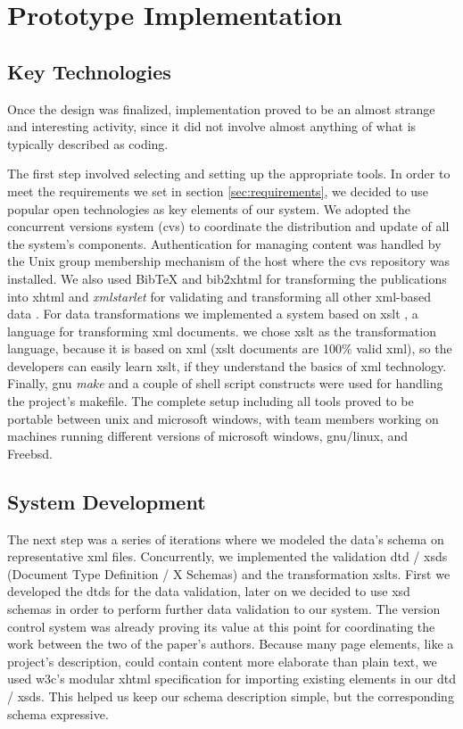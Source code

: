 \documentclass{elsart}
\begin{document}
\section{Prototype Implementation}

\subsection{Key Technologies}
\label{subsec:key-tech}

Once the design was finalized,
implementation proved to be an almost strange and interesting activity,
since it did not involve almost anything of what
is typically described as coding.

The first step involved selecting and setting up the
appropriate tools. In order to meet the requirements we set in section \ref{sec:requirements}, 
we decided to use popular open
technologies as key elements of our system.
We adopted the concurrent versions system
({\sc cvs}) \cite{BF01,CVS} to coordinate the distribution
and update of all the system's components.
Authentication for managing content was handled by the
Unix group membership mechanism of the host where the
{\sc cvs} repository was installed.
We also used
{\sc BibTeX} \cite{Pa88,Lam94} and {\sc bib2xhtml} \cite{BibXHMTL} for transforming the publications
into {\sc xhtml} and
\textit{xmlstarlet} \cite{Gru04} for validating and transforming
all other {\sc xml}-based data \cite{W3C_XML}.
For data transformations we 
implemented a system based on {\sc xslt} \cite{W3C_XSLT}, a language for transforming {\sc xml} documents.
we chose {\sc xslt} as the transformation language, because it is based on {\sc xml} ({\sc xslt} documents are 100\% valid {\sc xml}), so the
developers can easily learn {\sc xslt}, if they understand the basics of {\sc xml} technology.
Finally, {\sc gnu} {\em make} \cite{gnu_make} and a couple of shell script
constructs were used for handling the project's makefile.
The complete setup including all tools proved to be portable
between {\sc unix} and {\sc microsoft windows}, with team members working
on machines running different versions of {\sc microsoft windows}, {\sc gnu/linux},
and Free{\sc bsd}.

\subsection{System Development}

The next step was a series of iterations where we
modeled the data's schema on representative {\sc xml}
files. Concurrently, we implemented the validation {\sc dtd / xsd}s (Document Type Definition / X Schemas)
and the transformation {\sc xslt}s. First we developed the {\sc dtd}s
for the data validation, later on we decided to use {\sc xsd} schemas in order to perform
further data validation to our system.
The version control system was already proving its value
at this point
for coordinating the work between the two of the paper's authors.
Because many page elements, like a project's description,
could contain content more elaborate than plain text,
we used {\sc w3c}'s modular {\sc xhtml} specification for
importing existing elements in our {\sc dtd / xsd}s.
This helped us keep our schema description simple,
but the corresponding schema expressive.
\end{document}
